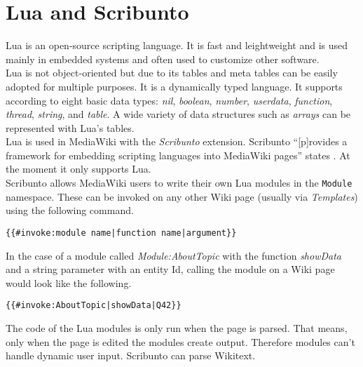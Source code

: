 \section{Lua and Scribunto}


Lua is an open-source scripting language. It is fast and leightweight and is used mainly in embedded systems and often used to customize other software. \citep{lua:01} \\
Lua is not object-oriented but due to its tables and meta tables can be easily adopted for multiple purposes. It is a dynamically typed language. It supports according to \citet[9]{luabook:01} eight basic data types: \textit{nil}, \textit{boolean}, \textit{number}, \textit{userdata}, \textit{function}, \textit{thread}, \textit{string}, and \textit{table}. A wide variety of data structures such as \textit{arrays} can be represented with Lua's tables. \\
Lua is used in MediaWiki with the \textit{Scribunto} extension. Scribunto ``[p]rovides a framework for embedding scripting languages into MediaWiki pages'' states \citet{wiki:19}. At the moment it only supports Lua. \\
Scribunto allows MediaWiki users to write their own Lua modules in the \texttt{\justify Module} namespace. These can be invoked on any other Wiki page (usually via \textit{Templates}) using the following command.
\begin{lstlisting}[frame=single] 
{{#invoke:module name|function name|argument}}
\end{lstlisting}

In the case of a module called \textit{Module:AboutTopic} with the function \textit{showData} and a string parameter with an entity Id, calling the module on a Wiki page would look like the following.
\begin{lstlisting}[frame=single] 
{{#invoke:AboutTopic|showData|Q42}}
\end{lstlisting}

The code of the Lua modules is only run when the page is parsed. That means, only when the page is edited the modules create output. Therefore modules can't handle dynamic user input. \citep{wiki:20} Scribunto can parse Wikitext. 
